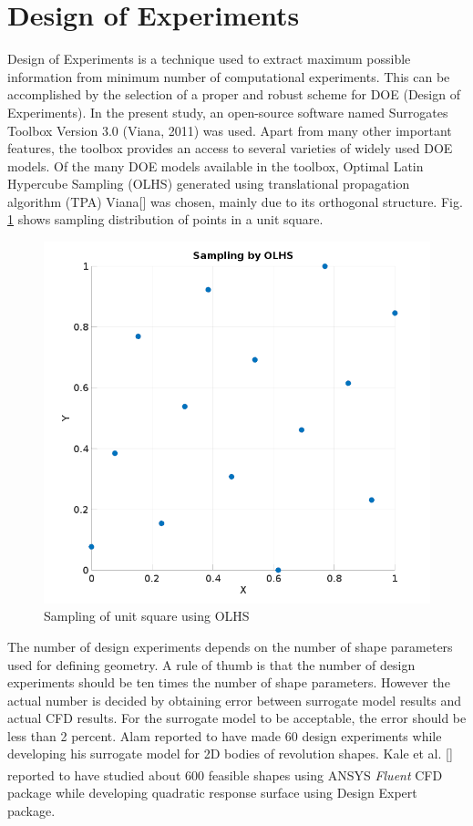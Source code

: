 \section{Design of Experiments}
\label{DOE}
Design of Experiments is a technique used to extract maximum possible information from minimum number of computational experiments. This can be accomplished by the selection of a proper and robust scheme for DOE (Design of Experiments). In the present study, an open-source software named Surrogates Toolbox Version 3.0 (Viana, 2011) was used. Apart from many other important features, the toolbox provides an access to several varieties of widely used DOE models. Of the many DOE models available in the toolbox, Optimal Latin Hypercube Sampling (OLHS) generated using translational propagation algorithm (TPA) Viana[] was chosen, mainly due to its orthogonal structure. Fig. \ref{OLHS Sampling} shows sampling distribution of points in a unit square.

\begin{figure}[htbp]
	\centering
	\includegraphics[width=200 pt]{optimization/OLHS_DOE}
	\caption{Sampling of unit square using OLHS }
	\label{OLHS Sampling}
\end{figure}

 The number of design experiments depends on the number of shape parameters used for defining geometry. A rule of thumb is that the number of design experiments should be ten times the number of shape parameters. However the actual number is decided by obtaining error between surrogate model results and actual CFD results. For the surrogate model to be acceptable, the error should be less than 2 percent. Alam  reported to have made 60 design experiments while developing his surrogate model for 2D bodies of revolution shapes. Kale et al. [] reported to have studied about 600 feasible shapes using ANSYS\textsuperscript{\textregistered} \textit{Fluent} CFD package while developing quadratic response surface using Design Expert package.

